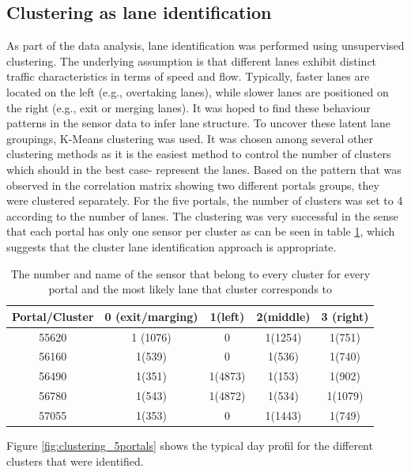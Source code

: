 	\subsection{Clustering as lane identification}
	As part of the data analysis, lane identification was performed using unsupervised clustering.
	The underlying assumption is that different lanes exhibit distinct traffic characteristics in terms of speed and flow. Typically, faster lanes are located on the left (e.g., overtaking lanes), while slower lanes are positioned on the right (e.g., exit or merging lanes). It was hoped to find these behaviour patterns in the sensor data to infer lane structure.
	To uncover these latent lane groupings, K-Means clustering was used. It was chosen among several other clustering methods as it is the easiest method to control the number of clusters which should in the best case- represent the lanes.
	Based on the pattern that was observed in the correlation matrix showing two different portals groups, they were clustered separately. \newline 
	For the five portals, the number of clusters was set to 4 according to the number of lanes.
	The clustering was very successful in the sense that each portal has only one sensor per cluster as can be seen in table \ref{tab:cluster}, which suggests that the cluster lane identification approach is appropriate. 
	\begin{table}[H]
		\centering
		\caption{The number and name of the sensor that belong to every cluster for every portal and the most likely lane that cluster corresponds to}
		\label{tab:cluster}
		\begin{tabular}{c|cccc}
			Portal/Cluster & 0 (exit/marging) & 1(left) & 2(middle) & 3 (right) \\
			\hline 
			55620          & 1 (1076)         & 0       & 1(1254)   & 1(751)    \\
			56160          & 1(539)           & 0       & 1(536)    & 1(740)    \\
			56490          & 1(351)           & 1(4873) & 1(153)    & 1(902)    \\
			56780          & 1(543)           & 1(4872) & 1(534)    & 1(1079)   \\
			57055          & 1(353)           & 0       & 1(1443)   & 1(749)   
		\end{tabular}
	\end{table}
	\noindent Figure \ref{fig:clustering_5portals} shows the typical day profil for the different clusters that were identified.
